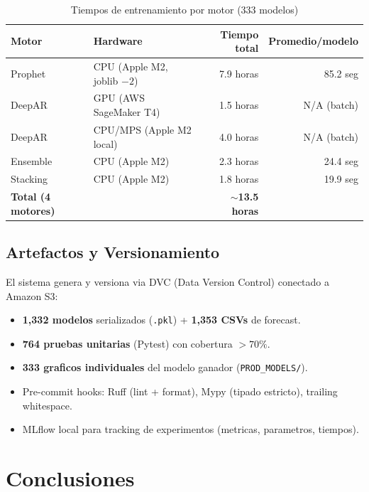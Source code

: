 \documentclass[12pt, letterpaper]{article}
\begin{document}
\begin{table}[H]
\centering
\caption{Tiempos de entrenamiento por motor (333 modelos)}
\label{tab:tiempos}
\small
\begin{tabular}{llrr}
\toprule
\textbf{Motor} & \textbf{Hardware} & \textbf{Tiempo total} & \textbf{Promedio/modelo} \\
\midrule
Prophet   & CPU (Apple M2, joblib $-2$) & 7.9 horas  & 85.2 seg \\
DeepAR    & GPU (AWS SageMaker T4)     & 1.5 horas  & N/A (batch) \\
DeepAR    & CPU/MPS (Apple M2 local)   & 4.0 horas  & N/A (batch) \\
Ensemble  & CPU (Apple M2)             & 2.3 horas  & 24.4 seg \\
Stacking  & CPU (Apple M2)             & 1.8 horas  & 19.9 seg \\
\midrule
\textbf{Total (4 motores)} & & \textbf{$\sim$13.5 horas} & \\
\bottomrule
\end{tabular}
\end{table}

\subsection{Artefactos y Versionamiento}

El sistema genera y versiona via DVC (Data Version Control) conectado a Amazon S3:
\begin{itemize}[noitemsep]
    \item \textbf{1,332 modelos} serializados (\texttt{.pkl}) + \textbf{1,353 CSVs} de forecast.
    \item \textbf{764 pruebas unitarias} (Pytest) con cobertura $>70\%$.
    \item \textbf{333 graficos individuales} del modelo ganador (\texttt{PROD\_MODELS/}).
    \item Pre-commit hooks: Ruff (lint + format), Mypy (tipado estricto), trailing whitespace.
    \item MLflow local para tracking de experimentos (metricas, parametros, tiempos).
\end{itemize}

\newpage

\section{Conclusiones}\label{sec:conclusiones}
\end{document}
